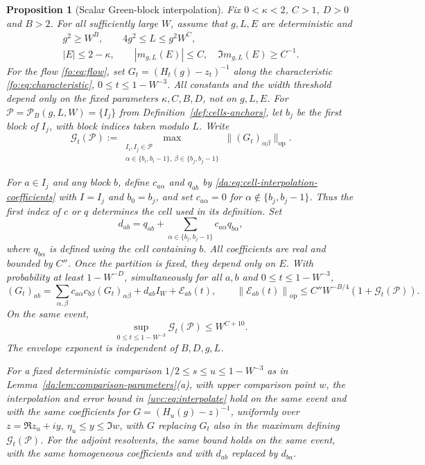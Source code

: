 \documentclass[11pt]{article}
\numberwithin{equation}{section}
\newtheorem{proposition}[theorem]{Proposition}
\theoremstyle{remark}
\newcommand{\op}{\mathrm{op}}
\newcommand{\norm}[1]{\left\|#1\right\|}
\begin{document}
\begin{proposition}[Scalar Green-block interpolation]\label{uvc:prop:green}
Fix $0<\kappa<2$, $C>1$, $D>0$ and $B>2$.
For all sufficiently large $W$, assume that $g,L,E$ are deterministic and
\[
 \begin{gathered}
 g^2\ge W^B,\qquad 4g^2\le L\le g^2W^C,\\
 |E|\le2-\kappa,\qquad
 |m_{g,L}(E)|\le C,\quad \Im m_{g,L}(E)\ge C^{-1}.
 \end{gathered}
\]
For the flow \eqref{fo:eq:flow}, set $G_t=(H_t(g)-z_t)^{-1}$ along
the characteristic \eqref{fo:eq:characteristic}, $0\le t\le1-W^{-3}$.
All constants and the width threshold depend only on the fixed parameters
$\kappa,C,B,D$, not on $g,L,E$.
For $\mathcal P=\mathcal P_B(g,L,W)=\{I_j\}$ from
Definition~\ref{def:cells-anchors}, let
$b_j$ be the first block of $I_j$, with block indices taken modulo $L$.
Write
\[
 \mathcal G_t(\mathcal P):=
 \max_{\substack{I_i,I_j\in\mathcal P\\
                  \alpha\in\{b_i,b_i-1\},\ \beta\in\{b_j,b_j-1\}}}
 \|(G_t)_{\alpha\beta}\|_{\op}.
\]

For $a\in I_j$ and any block $b$, define $c_{a\alpha}$ and $q_{ab}$ by
\eqref{da:eq:cell-interpolation-coefficients} with $I=I_j$ and $b_0=b_j$,
and set $c_{a\alpha}=0$ for $\alpha\notin\{b_j,b_j-1\}$.
Thus the first index of $c$ or $q$ determines the cell used in its definition.
Set
\[
 d_{ab}=q_{ab}+\sum_{\alpha\in\{b_j,b_j-1\}}c_{a\alpha}q_{b\alpha},
\]
where $q_{b\alpha}$ is defined using the cell containing $b$.
All coefficients are real and bounded by $C''$.
Once the partition is fixed, they
depend only on $E$.
With probability at least $1-W^{-D}$, simultaneously for all
$a,b$ and $0\le t\le1-W^{-3}$,
\begin{equation}\label{uvc:eq:interpolate}
 (G_t)_{ab}
 =\sum_{\alpha,\beta}c_{a\alpha}c_{b\beta}
                       (G_t)_{\alpha\beta}
       +d_{ab}I_W+\mathcal E_{ab}(t),\qquad
 \norm{\mathcal E_{ab}(t)}_{\op}
       \le C''W^{-B/4}(1+\mathcal G_t(\mathcal P)).
\end{equation}
On the same event,
\begin{equation}\label{uvc:eq:anchor-time-envelope}
 \sup_{0\le t\le1-W^{-3}}\mathcal G_t(\mathcal P)\le W^{C+10}.
\end{equation}
The envelope exponent is independent of $B,D,g,L$.

For a fixed deterministic comparison $1/2\le s\le u\le1-W^{-3}$ as in
Lemma~\ref{da:lem:comparison-parameters}(a), with upper comparison point $w$,
the interpolation and error bound in \eqref{uvc:eq:interpolate} hold
on the same event and with the same coefficients for $G=(H_u(g)-z)^{-1}$,
uniformly over $z=\Re z_u+iy$, $\eta_u\le y\le\Im w$, with $G$ replacing
$G_t$ also in the maximum defining $\mathcal G_t(\mathcal P)$.
For the adjoint resolvents, the same bound holds on the same event,
with the same homogeneous coefficients and with $d_{ab}$ replaced by $d_{ba}$.
\end{proposition}
\end{document}

